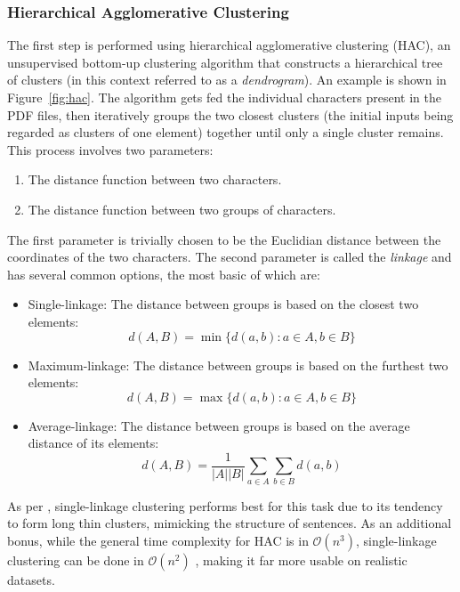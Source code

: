 \subsubsection{Hierarchical Agglomerative Clustering}
The first step is performed using hierarchical agglomerative clustering (HAC),
an unsupervised bottom-up clustering algorithm that constructs a hierarchical
tree of clusters (in this context referred to as a \emph{dendrogram}). An
example is shown in Figure~\ref{fig:hac}. The algorithm gets fed the individual
characters present in the PDF files, then iteratively groups the two closest
clusters (the initial inputs being regarded as clusters of one element) together
until only a single cluster remains. This process involves two parameters:
\begin{enumerate}
\item The distance function between two characters.
\item The distance function between two groups of characters.
\end{enumerate}
The first parameter is trivially chosen to be the Euclidian distance between the
coordinates of the two characters. The second parameter is called the
\emph{linkage} and has several common options, the most basic of which are:
\begin{itemize}
\item Single-linkage: The distance between groups is based on the closest two
  elements: \[ d(A, B) = \min \{ d(a, b) : a \in A, b \in B \} \]
\item Maximum-linkage: The distance between groups is based on the furthest two
  elements: \[ d(A, B) = \max \{ d(a, b) : a \in A, b \in B \} \]
\item Average-linkage: The distance between groups is based on the average
  distance of its elements:
  \[ d(A, B) = \frac{1}{|A||B|} \sum_{a \in A}\sum_{b \in B} d(a, b) \]
\end{itemize}
As per \textcite{klampfl2014unsupervised}, single-linkage clustering performs
best for this task due to its tendency to form long thin clusters, mimicking the
structure of sentences. As an additional bonus, while the general time
complexity for HAC is in $\mathcal{O}(n^3)$, single-linkage clustering can be
done in $\mathcal{O}(n^2)$ \citep{sibson1973slink}, making it far more usable on
realistic datasets.

